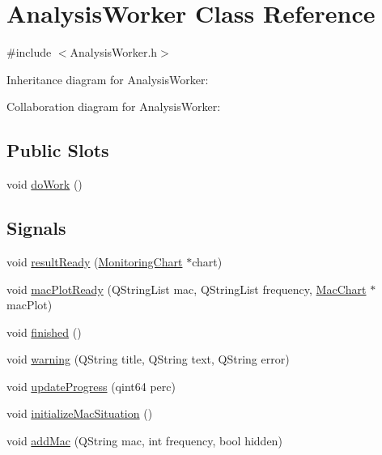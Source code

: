 \hypertarget{class_analysis_worker}{}\section{Analysis\+Worker Class Reference}
\label{class_analysis_worker}


{\ttfamily \#include $<$Analysis\+Worker.\+h$>$}



Inheritance diagram for Analysis\+Worker\+:


Collaboration diagram for Analysis\+Worker\+:
\subsection*{Public Slots}
\begin{DoxyCompactItemize}
\item 
void \hyperlink{class_analysis_worker_ab2f524e8e04ca2844ed3df3909541374}{do\+Work} ()
\end{DoxyCompactItemize}
\subsection*{Signals}
\begin{DoxyCompactItemize}
\item 
void \hyperlink{class_analysis_worker_aa02712f415266b80f078a65ef45defe9}{result\+Ready} (\hyperlink{class_monitoring_chart}{Monitoring\+Chart} $\ast$chart)
\item 
void \hyperlink{class_analysis_worker_a44e7df8efd66c1b071d6f43a313ed6ef}{mac\+Plot\+Ready} (Q\+String\+List mac, Q\+String\+List frequency, \hyperlink{class_mac_chart}{Mac\+Chart} $\ast$mac\+Plot)
\item 
void \hyperlink{class_analysis_worker_adf45ce89d5a8e078f250d2f074138f7b}{finished} ()
\item 
void \hyperlink{class_analysis_worker_a93420a620050e4d242ce4f26989790e8}{warning} (Q\+String title, Q\+String text, Q\+String error)
\item 
void \hyperlink{class_analysis_worker_a4a7f46d081dfd2872a498f1183581ea9}{update\+Progress} (qint64 perc)
\item 
void \hyperlink{class_analysis_worker_aecdbd0279caf0dbbc77b2a660a2cca45}{initialize\+Mac\+Situation} ()
\item 
void \hyperlink{class_analysis_worker_ac440daa1329ccf74e6cb08282da1a310}{add\+Mac} (Q\+String mac, int frequency, bool hidden)
\end{DoxyCompactItemize}

